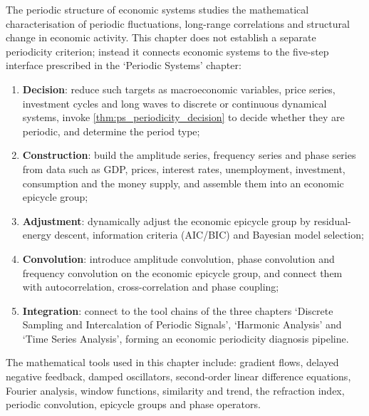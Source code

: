 \begin{remark}\label{rem:econ_five_steps_positioning}
The periodic structure of economic systems studies the mathematical characterisation of periodic fluctuations, long-range correlations and structural change in economic activity. This chapter does not establish a separate periodicity criterion; instead it connects economic systems to the five-step interface prescribed in the `Periodic Systems' chapter:
\begin{enumerate}[label=(\arabic*)]
    \item \textbf{Decision}: reduce such targets as macroeconomic variables, price series, investment cycles and long waves to discrete or continuous dynamical systems, invoke \cref{thm:ps_periodicity_decision} to decide whether they are periodic, and determine the period type;
    \item \textbf{Construction}: build the amplitude series, frequency series and phase series from data such as GDP, prices, interest rates, unemployment, investment, consumption and the money supply, and assemble them into an economic epicycle group;
    \item \textbf{Adjustment}: dynamically adjust the economic epicycle group by residual-energy descent, information criteria (AIC/BIC) and Bayesian model selection;
    \item \textbf{Convolution}: introduce amplitude convolution, phase convolution and frequency convolution on the economic epicycle group, and connect them with autocorrelation, cross-correlation and phase coupling;
    \item \textbf{Integration}: connect to the tool chains of the three chapters `Discrete Sampling and Intercalation of Periodic Signals', `Harmonic Analysis' and `Time Series Analysis', forming an economic periodicity diagnosis pipeline.
\end{enumerate}
The mathematical tools used in this chapter include: gradient flows, delayed negative feedback, damped oscillators, second-order linear difference equations, Fourier analysis, window functions, similarity and trend, the refraction index, periodic convolution, epicycle groups and phase operators.
\end{remark}

